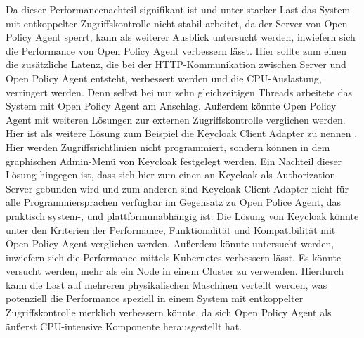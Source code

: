Da dieser Performancenachteil signifikant ist und unter starker Last das System mit entkoppelter Zugriffskontrolle nicht stabil arbeitet, da der Server von Open Policy Agent sperrt, kann als weiterer Ausblick untersucht werden, inwiefern sich die Performance von Open Policy Agent verbessern lässt. Hier sollte zum einen die zusätzliche Latenz, die bei der HTTP-Kommunikation zwischen Server und Open Policy Agent entsteht, verbessert werden und die CPU-Auslastung, verringert werden. Denn selbst bei nur zehn gleichzeitigen Threads arbeitete das System mit Open Policy Agent am Anschlag. Außerdem könnte Open Policy Agent mit weiteren Lösungen zur externen Zugriffskontrolle verglichen werden. Hier ist als weitere Lösung zum Beispiel die Keycloak Client Adapter zu nennen \citep{keycloakclientadapter:2021}. Hier werden Zugriffsrichtlinien nicht programmiert, sondern können in dem graphischen Admin-Menü von Keycloak festgelegt werden. Ein Nachteil dieser Lösung hingegen ist, dass sich hier zum einen an Keycloak als Authorization Server gebunden wird und zum anderen sind Keycloak Client Adapter nicht für alle Programmiersprachen verfügbar im Gegensatz zu Open Police Agent, das praktisch system-, und plattformunabhängig ist. Die Lösung von Keycloak könnte unter den Kriterien der Performance, Funktionalität und Kompatibilität mit Open Policy Agent verglichen werden. Außerdem könnte untersucht werden, inwiefern sich die Performance mittels Kubernetes verbessern lässt. Es könnte versucht werden, mehr als ein Node in einem Cluster zu verwenden. Hierdurch kann die Last auf mehreren physikalischen Maschinen verteilt werden, was potenziell die Performance speziell in einem System mit entkoppelter Zugriffskontrolle merklich verbessern könnte, da sich Open Policy Agent als äußerst CPU-intensive Komponente herausgestellt hat. 